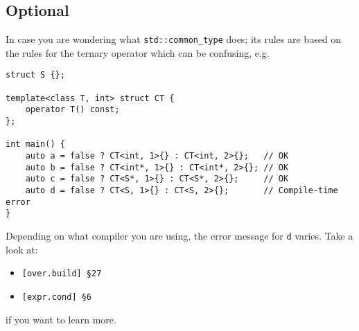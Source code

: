 \newpage

\subsection{Optional}
In case you are wondering what \texttt{std::common\_type} does; its rules are based on the rules for the ternary operator which can be confusing, e.g.
\begin{lstlisting}[title=\href{https://godbolt.org/z/4TGmK6}{\texttt{godbolt.org/z/4TGmK6}}]
struct S {};

template<class T, int> struct CT {
    operator T() const;
};

int main() {
    auto a = false ? CT<int, 1>{} : CT<int, 2>{};   // OK
    auto b = false ? CT<int*, 1>{} : CT<int*, 2>{}; // OK
    auto c = false ? CT<S*, 1>{} : CT<S*, 2>{};     // OK
    auto d = false ? CT<S, 1>{} : CT<S, 2>{};       // Compile-time error
}
\end{lstlisting}
Depending on what compiler you are using, the error message for \texttt{d} varies. Take a look at:
\begin{itemize}
    \item \texttt{[over.build] \S27}
    \item \texttt{[expr.cond] \S6}
\end{itemize}
if you want to learn more.

